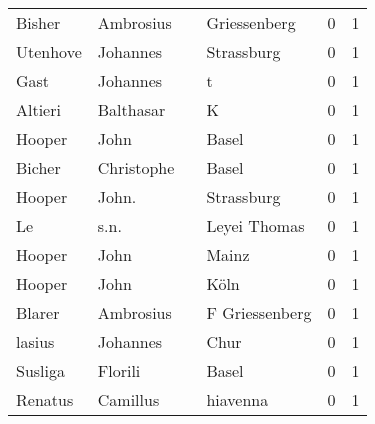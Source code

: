 \begin{center}
\begin{tiny}
\begin{longtabu}{llllrr}
                   Bisher &                          Ambrosius &             &                                Griessenberg &          0 &         1 \\
                 Utenhove &                           Johannes &             &                                  Strassburg &          0 &         1 \\
                     Gast &                           Johannes &             &                                           t &          0 &         1 \\
                  Altieri &                          Balthasar &             &                                           K &          0 &         1 \\
                   Hooper &                               John &             &                                       Basel &          0 &         1 \\
                   Bicher &                         Christophe &             &                                       Basel &          0 &         1 \\
                   Hooper &                              John. &             &                                  Strassburg &          0 &         1 \\
                       Le &                               s.n. &             &                                Leyei Thomas &          0 &         1 \\
                   Hooper &                               John &             &                                       Mainz &          0 &         1 \\
                   Hooper &                               John &             &                                        Köln &          0 &         1 \\
                   Blarer &                          Ambrosius &             &                              F Griessenberg &          0 &         1 \\
                   lasius &                           Johannes &             &                                        Chur &          0 &         1 \\
                  Susliga &                            Florili &             &                                       Basel &          0 &         1 \\
                  Renatus &                           Camillus &             &                                    hiavenna &          0 &         1 \\

\end{longtabu}
\end{tiny}
\end{center}
